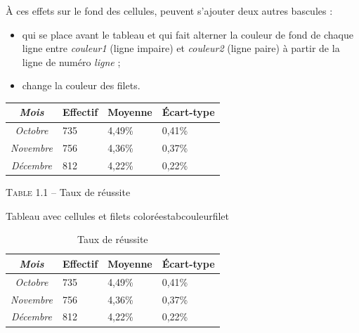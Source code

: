 \`{A} ces effets sur le fond des cellules, peuvent s'ajouter deux autres bascules :
\begin{itemize}
\item {} qui se place avant le tableau et qui fait alterner la couleur de fond de chaque ligne entre \emph{couleur1} (ligne impaire) et \emph{couleur2} (ligne paire) à partir de la ligne de numéro \emph{ligne} ;
\item {} change la couleur des filets.
\end{itemize}

\begin{codedoublevrai}
\centering
{}
\begin{tabular}{|>{\slshape}c||m{2cm}<{\centering}|m{2cm}<{\centering}|
m{2cm}<{\centering}|}
\hline \rowcolor{bleu8} 
Mois       & Effectif  & Moyenne                   & \'{E}cart-type  \\ \hline \hline
Octobre    & 735       & \cellcolor{orange8}4,49\% & 0,41\%          \\ \hline
Novembre   & 756       & 4,36\%                    & 0,37\%          \\ \hline
Décembre   & 812       & 4,22\%                    & 0,22\%          \\ \hline
\end{tabular}
\par\vspace{0.8\baselineskip} \textsc{Table 1.1} -- Taux de réussite
\end{codedoublevrai}

\begin{codedoublefaux}{Tableau avec cellules et filets colorées}{tabcouleurfilet}
\begin{table}[!ht]
\centering
{}
\begin{tabular}{|>{\slshape}c||m{2cm}<{\centering}|m{2cm}<{\centering}|
m{2cm}<{\centering}|}
\hline \rowcolor{bleu8} 
Mois       & Effectif  & Moyenne                   & \'{E}cart-type  \\ \hline \hline
Octobre    & 735       & \cellcolor{orange8}4,49\% & 0,41\%          \\ \hline
Novembre   & 756       & 4,36\%                    & 0,37\%          \\ \hline
Décembre   & 812       & 4,22\%                    & 0,22\%          \\ \hline
\end{tabular}
\caption{Taux de réussite}
\end{table}
\end{codedoublefaux}


